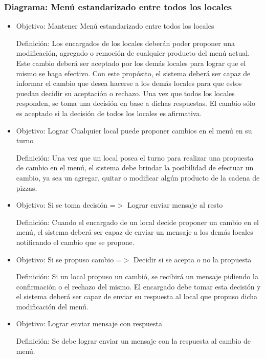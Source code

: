 \documentclass[a4paper,11pt] {article}
\begin{document}
\subsubsection*{Diagrama: Men\'u estandarizado entre todos los locales}
\begin{itemize}
 \item 
Objetivo: Mantener Men\'u estandarizado entre todos los locales

Definici\'on: Los encargados de los locales deber\'an poder proponer una modificaci\'on, agregado o remoci\'on de cualquier producto del men\'u actual. Este cambio deber\'a ser aceptado por los dem\'as locales para lograr que el mismo se haga efectivo. Con este prop\'osito, el sistema deber\'a ser capaz de informar el cambio que desea hacerse a los dem\'as locales para que estos puedan decidir su aceptaci\'on o rechazo. Una vez que todos los locales responden, se toma una decisi\'on en base a dichas respuestas. El cambio s\'olo es aceptado si la decisi\'on de todos los locales es afirmativa.

\item 
Objetivo: Lograr Cualquier local puede proponer cambios en el men\'u en su turno

Definici\'on: Una vez que un local posea el turno para realizar una propuesta de cambio en el men\'u, el sistema debe brindar la posibilidad de efectuar un cambio, ya sea un agregar, quitar o modificar alg\'un producto de la cadena de pizzas.

\item 
Objetivo: Si se toma decisi\'on =$>$ Lograr enviar mensaje al resto

Definici\'on: Cuando el encargado de un local decide proponer un cambio en el men\'u, el sistema deber\'a ser capaz de enviar un mensaje a los demás locales notificando el cambio que se propone.

\item 
Objetivo: Si se propuso cambio =$>$ Decidir si se acepta o no la propuesta

Definici\'on: Si un local propuso un cambi\'o, se recibir\'a un mensaje pidiendo la confirmaci\'on o el rechazo del mismo. El encargado debe tomar esta decisi\'on y el sistema deber\'a ser capaz de enviar su respuesta al local que propuso dicha modificaci\'on del men\'u.

\item 
Objetivo: Lograr enviar mensaje con respuesta

Definici\'on: Se debe lograr enviar un mensaje con la respuesta al cambio de men\'u.


\end{itemize}
\end{document}
